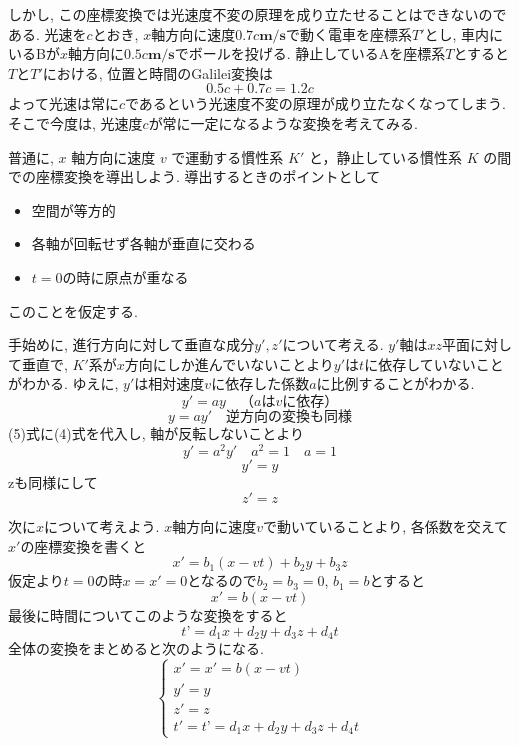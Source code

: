 \documentclass{ltjsarticle}
\begin{document}
しかし, この座標変換では光速度不変の原理を成り立たせることはできないのである. 光速を$c$とおき, 
$x$軸方向に速度$0.7c\mathbf{m/s}$で動く電車を座標系$T'$とし, 車内にいるBが$x$軸方向に$0.5c\mathbf{m/s}$でボールを投げる. 
静止しているAを座標系$T$とすると$T$と$T'$における, 位置と時間のGalilei変換は
\[
0.5c + 0.7c = 1.2c
\]
よって光速は常に$c$であるという光速度不変の原理が成り立たなくなってしまう. 
そこで今度は, 光速度$c$が常に一定になるような変換を考えてみる. 

普通に, $x$ 軸方向に速度 $v$ で運動する慣性系 $K'$ と，静止している慣性系 $K$ の間での座標変換を導出しよう. 
導出するときのポイントとして
\begin{itemize}
    \item 空間が等方的
    \item 各軸が回転せず各軸が垂直に交わる
    \item $t = 0$の時に原点が重なる
\end{itemize}
このことを仮定する. 

手始めに, 進行方向に対して垂直な成分$y', z'$について考える. 
$y'$軸は$xz$平面に対して垂直で, $K'$系が$x$方向にしか進んでいないことより$y'$は$t$に依存していないことがわかる. 
ゆえに, $y'$は相対速度$v$に依存した係数$a$に比例することがわかる. 
\begin{equation}
  y'=ay \quad（aはvに依存） 
\end{equation}
\begin{equation}
  y = ay' \quad 逆方向の変換も同様
\end{equation}
(5)式に(4)式を代入し, 軸が反転しないことより
\begin{equation}
  y' = a^{2} y' \quad a^2=1 \quad a=1
\end{equation}
\begin{equation}
  y' = y
\end{equation}
zも同様にして
\begin{equation}
  z' = z
\end{equation}

次に$x$について考えよう. 
$x$軸方向に速度$v$で動いていることより, 各係数を交えて$x'$の座標変換を書くと
\begin{equation}
  x' = b_1(x - vt) + b_2y + b_3z
\end{equation}
仮定より$t = 0$の時$x=x'=0$となるので$b_2 = b_3 = 0$, $b_1 = b$とすると
\begin{equation}
  x' = b(x - vt)
\end{equation}
最後に時間についてこのような変換をすると
\begin{equation}
  t’=d_1 x+d_2 y+d_3 z+d_4 t
\end{equation}
全体の変換をまとめると次のようになる. 
\begin{equation}
\begin{cases}
x' = x' = b(x - vt) \\
y' = y \\
z' = z \\
t' = t’ = d_1 x + d_2 y + d_3 z + d_4 t
\end{cases}
\end{equation}
\end{document}
